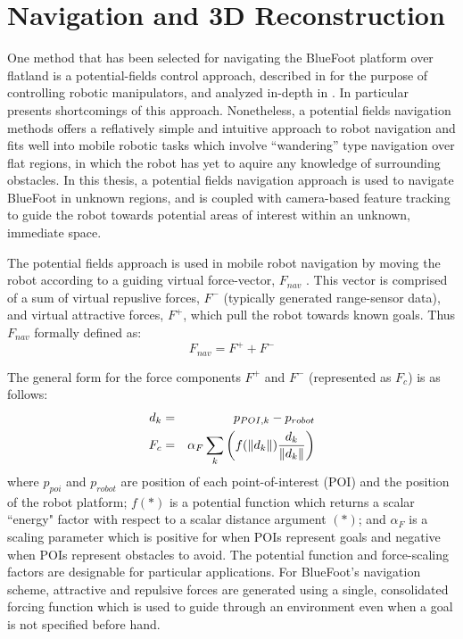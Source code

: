 		\section{Navigation and 3D Reconstruction}

		One method that has been selected for navigating the BlueFoot platform over flatland is a potential-fields control approach, described in \cite{Hogan1984} for the purpose of controlling robotic manipulators, and analyzed in-depth in \cite{Koren1991}. In particular \cite{Koren1991} presents shortcomings of this approach. Nonetheless, a potential fields navigation methods offers a reflatively simple and intuitive approach to robot navigation and fits well into mobile robotic tasks which involve ``wandering'' type navigation over flat regions, in which the robot has yet to aquire any knowledge of surrounding obstacles. In this thesis, a potential fields navigation approach is used to navigate BlueFoot in unknown regions, and is coupled with camera-based feature tracking to guide the robot towards potential areas of interest within an unknown, immediate space.

		The potential fields approach is used in mobile robot navigation by moving the robot according to a guiding virtual force-vector, $F_{nav}$ \cite{Koren1991,ArambulaCosio2004}. This vector is comprised of a sum of virtual repuslive forces, $F^{-}$ (typically generated range-sensor data), and virtual attractive forces, $F^{+}$, which pull the robot towards known goals. Thus $F_{nav}$ formally defined as:
		\begin{equation}
			F_{nav} = F^{+} + F^{-}
			\label{eq::sumofforces}
		\end{equation}

		The general form for the force components $F^{+}$ and $F^{-}$ (represented as $F_{c}$) is as follows:
		\begin{eqnarray}
			d_{k} 	&=& p_{POI,k} - p_{robot} \nonumber\\
			F_{c}	&=& \alpha_{F}\sum_{k}\left( f(\left\lVert d_{k}\right\rVert)\frac{d_{k}}{\left\lVert d_{k}\right\rVert} \right)
			\label{eq::sumofforces}
		\end{eqnarray}	
		where $p_{poi}$ and $p_{robot}$ are position of each \Kth point-of-interest (POI) and the position of the robot platform; $f(*)$ is a potential function which returns a scalar ``energy" factor with respect to a scalar distance argument $(*)$; and $\alpha_{F}$ is a scaling parameter which is positive for when POIs represent goals and negative when POIs represent obstacles to avoid. The potential function and force-scaling factors are designable for particular applications. For BlueFoot's navigation scheme, attractive and repulsive forces are generated using a single, consolidated forcing function which is used to guide through an environment even when a goal is not specified before hand. 

